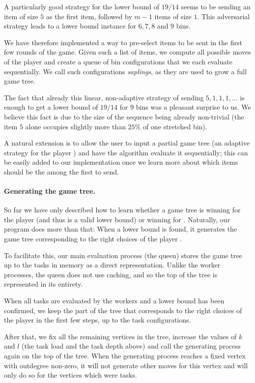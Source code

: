 A particularly good strategy for the lower bound of $19/14$ seems to
be sending an item of size $5$ as the first item, followed by $m-1$
items of size $1$. This adversarial strategy leads to a lower bound
instance for $6,7,8$ and $9$ bins.

We have therefore implemented a way to pre-select items to be sent in
the first few rounds of the game. Given such a list of items, we
compute all possible moves of the player \algo and create a queue of
bin configurations that we each evaluate sequentially. We call such
configurations \emph{saplings}, as they are used to grow a full game
tree.

The fact that already this linear, non-adaptive strategy of sending
$5,1,1,1,\ldots$ is enough to get a lower bound of $19/14$ for $9$
bins was a pleasant surprise to us. We believe this fact is due to the
size of the sequence being already non-trivial (the item $5$ alone
occupies slightly more than $25\%$ of one stretched bin).

A natural extension is to allow the user to input a partial game tree
(an adaptive strategy for the player \adversary) and have the
algorithm evaluate it sequentially; this can be easily added to our
implementation once we learn more about which items should be the
among the first to send.

\paragraph{Generating the game tree.} So far we have only described
how to learn whether a game tree is winning for the player \adversary
(and thus is a valid lower bound) or winning for \algo. Naturally, our
program does more than that: When a lower bound is found, it generates
the game tree corresponding to the right choices of the player
\adversary.

To facilitate this, our main evaluation process (the queen) stores the
game tree up to the tasks in memory as a direct representation. Unlike
the worker processes, the queen does not use caching, and so the top
of the tree is represented in its entirety.

When all tasks are evaluated by the workers and a lower bound has been
confirmed, we keep the part of the tree that corresponds to the right
choices of the player \algo in the first few steps, up to the task
configurations.

After that, we fix all the remaining vertices in the tree, increase
the values of $k$ and $l$ (the task load and the task depth above) and
call the generating process again on the top of the tree. When the
generating process reaches a fixed vertex with outdegree non-zero, it
will not generate other moves for this vertex and will only do so for
the vertices which were tasks.

